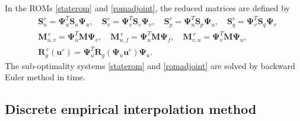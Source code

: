 \documentclass[preprint,12pt]{elsarticle}
\begin{document}
In the ROMs \eqref{staterom} and \eqref{romadjoint}, the reduced matrices are defined by
\begin{align*}
& \bm{S}^r_u=\bm{\Psi}_u^T \bm{S}_u\bm{\Psi}_u, \quad \bm{S}^r_v=\bm{\Psi}_v^T \bm{S}_v\bm{\Psi}_v, \quad \bm{S}^r_p=\bm{\Psi}_u^T \bm{S}_p\bm{\Psi}_u, \quad \bm{S}^r_q=\bm{\Psi}_v^T \bm{S}_q\bm{\Psi}_v  \\
& \bm{M}_{u,v}^{\,r}=\bm{\Psi}_u^T \bm{M} \bm{\Psi}_v, \quad \bm{M}_{u,f}^{\,r}=\bm{\Psi}_u^T \bm{M} \bm{\Psi}_f, \quad \bm{M}_{v,u}^{\,r}=\bm{\Psi}_v^T \bm{M} \bm{\Psi}_u, \\
& \bm{R}_g^{\,r}(\bm{u}^{r})=\bm{\Psi}_u^T \bm{R}_g(\bm{\Psi}_u\bm{u}^{r})\bm{\Psi}_u.
\end{align*}
The sub-optimality systems  \eqref{staterom} and \eqref{romadjoint} are solved by  backward Euler method in time.


\subsection{Discrete empirical interpolation method}
\label{deim}
\end{document}
